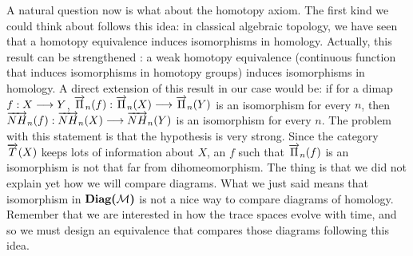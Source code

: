 	
	A natural question now is what about the homotopy axiom. The first kind we could think about follows this idea: in classical algebraic topology, we have seen that a homotopy equivalence induces isomorphisms in homology. Actually, this result can be strengthened \cite{hatcher02}: a weak homotopy equivalence (continuous function that induces isomorphisms in homotopy groups) induces isomorphisms in homology. A direct extension of this result in our case would be: if for a dimap $f : X \longrightarrow Y$, $\overrightarrow{\Pi}_{n}(f) : \overrightarrow{\Pi}_{n}(X) \longrightarrow \overrightarrow{\Pi}_{n}(Y)$ is an isomorphism for every $n$, then $\overrightarrow{NH}_{n}(f) : \overrightarrow{NH}_{n}(X) \longrightarrow \overrightarrow{NH}_{n}(Y)$ is an isomorphism for every $n$. The problem with this statement is that the hypothesis is very strong. Since the category $\overrightarrow{T}(X)$ keeps lots of information about $X$, an $f$ such that $\overrightarrow{\Pi}_{n}(f)$ is an isomorphism is not that far from dihomeomorphism. The thing is that we did not explain yet how we will compare diagrams. What we just said means that isomorphism in $\textbf{Diag(}\mathcal{M}\textbf{)}$ is not a nice way to compare diagrams of homology. Remember that we are interested in how the trace spaces evolve with time, and so we must design an equivalence that compares those diagrams following this idea.










